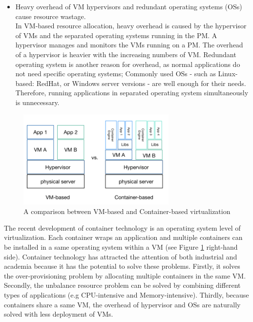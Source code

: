 \begin{itemize}
	\item Heavy overhead of VM hypervisors and redundant operating systems (OSs) cause resource wastage. \\
	In VM-based resource allocation, heavy overhead is caused by
	the hypervisor of VMs and the separated operating systems running in the PM. A hypervisor manages and monitors the VMs running on a PM. The overhead of a hypervisor is heavier with the increasing numbers of VM. Redundant operating system is another reason for overhead, as normal applications do not need specific operating systems; Commonly used OSs - such as Linux-based: RedHat, or Windows server versions - are well enough for their needs. Therefore, running applications in separated operating system simultaneously is unnecessary.
\end{itemize}

\begin{figure}
	\centering
	\includegraphics[width=0.7\textwidth]{pics/comparison.png}
	\caption{A comparison between VM-based and Container-based virtualization}
	\label{fig:comparison}
\end{figure}

The recent development of container technology \cite{Soltesz:2007cu} is an operating system level of virtualization. Each container wraps an application and multiple containers can be installed in a same operating system within a VM (see Figure \ref{fig:comparison} right-hand side). Container technology has attracted the attention of both industrial and academia because it has the potential to solve these problems. Firstly, it solves the over-provisioning problem by allocating multiple containers in the same VM. Secondly, the unbalance resource problem can be solved by combining different types of applications (e.g CPU-intensive and Memory-intensive). Thirdly, because containers share a same VM, the overhead of hypervisor and OSs are naturally solved with less deployment of VMs.


